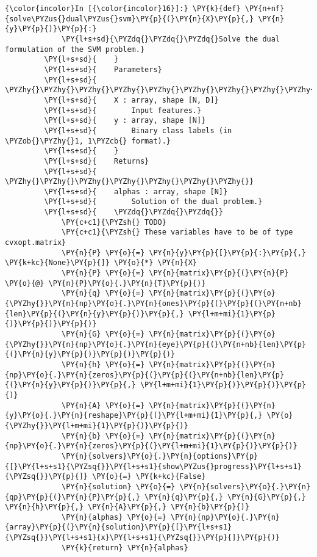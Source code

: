     \begin{Verbatim}[commandchars=\\\{\}]
{\color{incolor}In [{\color{incolor}16}]:} \PY{k}{def} \PY{n+nf}{solve\PYZus{}dual\PYZus{}svm}\PY{p}{(}\PY{n}{X}\PY{p}{,} \PY{n}{y}\PY{p}{)}\PY{p}{:}
             \PY{l+s+sd}{\PYZdq{}\PYZdq{}\PYZdq{}Solve the dual formulation of the SVM problem.}
         \PY{l+s+sd}{    }
         \PY{l+s+sd}{    Parameters}
         \PY{l+s+sd}{    \PYZhy{}\PYZhy{}\PYZhy{}\PYZhy{}\PYZhy{}\PYZhy{}\PYZhy{}\PYZhy{}\PYZhy{}\PYZhy{}}
         \PY{l+s+sd}{    X : array, shape [N, D]}
         \PY{l+s+sd}{        Input features.}
         \PY{l+s+sd}{    y : array, shape [N]}
         \PY{l+s+sd}{        Binary class labels (in \PYZob{}\PYZhy{}1, 1\PYZcb{} format).}
         \PY{l+s+sd}{    }
         \PY{l+s+sd}{    Returns}
         \PY{l+s+sd}{    \PYZhy{}\PYZhy{}\PYZhy{}\PYZhy{}\PYZhy{}\PYZhy{}\PYZhy{}}
         \PY{l+s+sd}{    alphas : array, shape [N]}
         \PY{l+s+sd}{        Solution of the dual problem.}
         \PY{l+s+sd}{    \PYZdq{}\PYZdq{}\PYZdq{}}
             \PY{c+c1}{\PYZsh{} TODO}
             \PY{c+c1}{\PYZsh{} These variables have to be of type cvxopt.matrix}
             \PY{n}{P} \PY{o}{=} \PY{n}{y}\PY{p}{[}\PY{p}{:}\PY{p}{,} \PY{k+kc}{None}\PY{p}{]} \PY{o}{*} \PY{n}{X}
             \PY{n}{P} \PY{o}{=} \PY{n}{matrix}\PY{p}{(}\PY{n}{P} \PY{o}{@} \PY{n}{P}\PY{o}{.}\PY{n}{T}\PY{p}{)}
             \PY{n}{q} \PY{o}{=} \PY{n}{matrix}\PY{p}{(}\PY{o}{\PYZhy{}}\PY{n}{np}\PY{o}{.}\PY{n}{ones}\PY{p}{(}\PY{p}{(}\PY{n+nb}{len}\PY{p}{(}\PY{n}{y}\PY{p}{)}\PY{p}{,} \PY{l+m+mi}{1}\PY{p}{)}\PY{p}{)}\PY{p}{)}
             \PY{n}{G} \PY{o}{=} \PY{n}{matrix}\PY{p}{(}\PY{o}{\PYZhy{}}\PY{n}{np}\PY{o}{.}\PY{n}{eye}\PY{p}{(}\PY{n+nb}{len}\PY{p}{(}\PY{n}{y}\PY{p}{)}\PY{p}{)}\PY{p}{)}
             \PY{n}{h} \PY{o}{=} \PY{n}{matrix}\PY{p}{(}\PY{n}{np}\PY{o}{.}\PY{n}{zeros}\PY{p}{(}\PY{p}{(}\PY{n+nb}{len}\PY{p}{(}\PY{n}{y}\PY{p}{)}\PY{p}{,} \PY{l+m+mi}{1}\PY{p}{)}\PY{p}{)}\PY{p}{)}
             \PY{n}{A} \PY{o}{=} \PY{n}{matrix}\PY{p}{(}\PY{n}{y}\PY{o}{.}\PY{n}{reshape}\PY{p}{(}\PY{l+m+mi}{1}\PY{p}{,} \PY{o}{\PYZhy{}}\PY{l+m+mi}{1}\PY{p}{)}\PY{p}{)}
             \PY{n}{b} \PY{o}{=} \PY{n}{matrix}\PY{p}{(}\PY{n}{np}\PY{o}{.}\PY{n}{zeros}\PY{p}{(}\PY{l+m+mi}{1}\PY{p}{)}\PY{p}{)}
             \PY{n}{solvers}\PY{o}{.}\PY{n}{options}\PY{p}{[}\PY{l+s+s1}{\PYZsq{}}\PY{l+s+s1}{show\PYZus{}progress}\PY{l+s+s1}{\PYZsq{}}\PY{p}{]} \PY{o}{=} \PY{k+kc}{False}
             \PY{n}{solution} \PY{o}{=} \PY{n}{solvers}\PY{o}{.}\PY{n}{qp}\PY{p}{(}\PY{n}{P}\PY{p}{,} \PY{n}{q}\PY{p}{,} \PY{n}{G}\PY{p}{,} \PY{n}{h}\PY{p}{,} \PY{n}{A}\PY{p}{,} \PY{n}{b}\PY{p}{)}
             \PY{n}{alphas} \PY{o}{=} \PY{n}{np}\PY{o}{.}\PY{n}{array}\PY{p}{(}\PY{n}{solution}\PY{p}{[}\PY{l+s+s1}{\PYZsq{}}\PY{l+s+s1}{x}\PY{l+s+s1}{\PYZsq{}}\PY{p}{]}\PY{p}{)}
             \PY{k}{return} \PY{n}{alphas}
\end{Verbatim}

